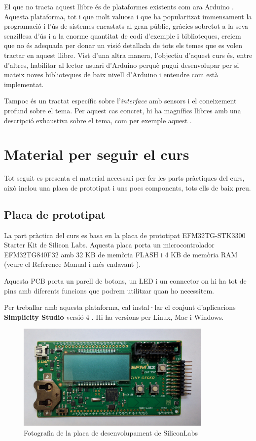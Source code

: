 El que no tracta aquest llibre és de plataformes existents com ara Arduino \cite{ARDUINO}. Aquesta plataforma, tot i que molt valuosa i que ha popularitzat immensament la programació i l'ús de sistemes encastats al gran públic, gràcies sobretot a la seva senzillesa d'ús i a la enorme quantitat de codi d'exemple i biblioteques, creiem que no és adequada per donar un visió detallada de tots els temes que es volen tractar en aquest llibre. Vist d'una altra manera, l'objectiu d'aquest curs és, entre d'altres, habilitar al lector usuari d'Arduino perquè pugui desenvolupar per si mateix noves biblioteques de baix nivell d'Arduino i entendre com està implementat.

Tampoc és un tractat específic sobre l'{\em interface} amb sensors i el coneixement profund sobre el tema. Per aquest cas concret, hi ha magnífics llibres amb una descripció exhaustiva sobre el tema, com per exemple aquest \cite{SensorTechnology}.

\section{Material per seguir el curs}
Tot seguit es presenta el material necessari per fer les parts pràctiques del curs, això inclou una placa de prototipat i uns pocs components, tots ells de baix preu.

\subsection{Placa de prototipat}
La part pràctica del curs es basa en la placa de prototipat EFM32TG-STK3300 Starter Kit de Silicon Labs. Aquesta placa porta un microcontrolador EFM32TG840F32 amb 32 KB de memòria \gls{FLASH} i 4 KB de memòria \gls{RAM} (veure el Reference Manual \cite{EFM32TGRM} i més endavant ).

Aquesta \gls{PCB} porta un parell de botons, un \gls{LED} i un connector on hi ha tot de pins amb diferents funcions que podrem utilitzar quan ho necessitem.

Per treballar amb aquesta plataforma, cal instal·lar el conjunt d'aplicacions {\bf Simplicity Studio} versió 4 \cite{simplicityURL}. Hi ha versions per Linux, Mac i Windows.

\begin{figure}
 \centering
 \includegraphics[width=0.85\textwidth, keepaspectratio]{imatges/tiny-gecko-starter-kit.jpg}
 \caption{Fotografia de la placa de desenvolupament de SiliconLabs}
 \label{fig:EFM32_DVK}
\end{figure}


